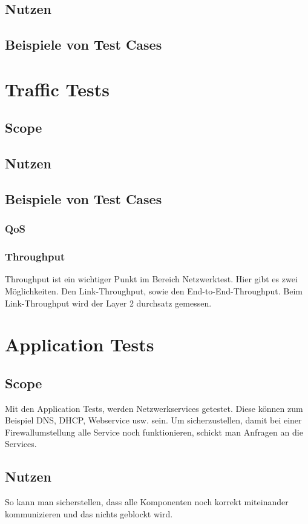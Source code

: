 \documentclass[a4,12pt]{scrartcl}
\begin{document}
\subsection{Nutzen}
\subsection{Beispiele von Test Cases}






\section{Traffic Tests}
\subsection{Scope}
\subsection{Nutzen}
\subsection{Beispiele von Test Cases}
\subsubsection{QoS}
\subsubsection{Throughput}
Throughput ist ein wichtiger Punkt im Bereich Netzwerktest. Hier gibt es zwei Möglichkeiten. Den Link-Throughput, sowie den End-to-End-Throughput.
Beim Link-Throughput wird der Layer 2 durchsatz gemessen. 



\section{Application Tests}
\subsection{Scope}
Mit den Application Tests, werden Netzwerkservices getestet. Diese können zum Beispiel DNS, DHCP, Webservice usw. sein.
Um sicherzustellen, damit bei einer Firewallumstellung alle Service noch funktionieren, schickt man Anfragen an die Services.
\subsection{Nutzen}
So kann man sicherstellen, dass alle Komponenten noch korrekt miteinander kommunizieren und das nichts geblockt wird.
\end{document}
